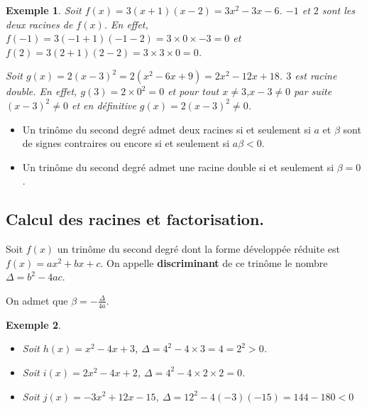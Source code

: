 \documentclass[a4paper,11pt]{article}
\theoremstyle{break}
\newtheorem{exemple}{Exemple}
\begin{document}
  \begin{exemple}
    Soit $f(x)=3(x+1)(x-2)=3x^2-3x-6$. $-1$ et $2$ sont les deux racines de $f(x)$.\newline
    En effet, $f(-1)=3(-1+1)(-1-2)=3\times0 \times -3=0$ et $f(2)=3(2+1)(2-2)=3 \times 3 \times 0=0$.
    
    Soit $g(x)=2(x-3)^2=2(x^2-6x+9)=2x^2-12x+18$. $3$ est racine double. 
    En effet, $g(3)=2\times 0^2=0$ et pour tout $x \neq 3$,$x-3\neq0$ par suite 
    $(x-3)^2 \neq 0$ et en définitive $g(x)=2(x-3)^2 \neq 0$. 
  \end{exemple}
  
  \begin{Prop}
    \begin{itemize}
     \item Un trinôme du second degré admet deux racines si et seulement si $a$ et $\beta$
   sont de signes contraires ou encore si et seulement si $a\beta<0$.
     \item Un trinôme du second degré admet une racine double si et seulement si
     $\beta=0$.
    \end{itemize}
  \end{Prop}
  
  \subsection{Calcul des racines et factorisation.}
  
  \begin{Def}[Discriminant]
    Soit $f(x)$ un trinôme du second degré dont la forme développée réduite
    est $f(x)=ax^2+bx+c$. On appelle \textbf{discriminant} de ce trinôme
    le nombre $\Delta=b^2-4ac$.
    
    On admet que $\beta=-\frac{\Delta}{4a}$.
  \end{Def}
  
  \begin{exemple}
    \begin{itemize}
     \item Soit $h(x)=x^2-4x+3$, $\Delta=4^2-4 \times 3=4=2^2>0$.
     \item Soit $i(x)=2x^2-4x+2$, $\Delta=4^2-4 \times 2 \times 2=0$.
     \item Soit $j(x)=-3x^2+12x-15$, $\Delta=12^2-4(-3)(-15)=144-180<0$
    \end{itemize}
   \end{exemple}
  
\end{document}
